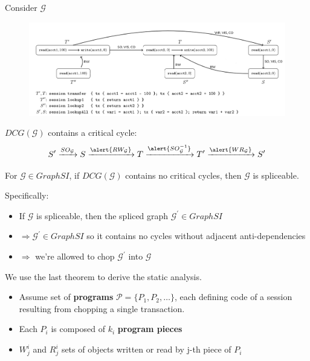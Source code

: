 \documentclass{beamer}
\begin{document}
\begin{frame}
	Consider $\mathcal{G}$
	\begin{figure}
		\includegraphics[scale=0.25]{fig4}
	\end{figure}
	\begin{example}
		$DCG(\mathcal{G})$ contains a critical cycle:
		$$  
			S^\prime \xrightarrow{SO_\mathcal{G}}
			S \xrightarrow{\alert{RW_\mathcal{G}}} 
			T \xrightarrow{\alert{SO^{-1}_\mathcal{G}}} 
			T^\prime \xrightarrow{\alert{WR_\mathcal{G}}} 
			S^\prime
		$$
	\end{example}
\end{frame}


\begin{frame}
	\begin{theorem}
		For $\mathcal{G} \in GraphSI$, if $DCG(\mathcal{G})$ contains no critical cycles, then $\mathcal{G}$ is spliceable.
	\end{theorem}
	Specifically:
	\begin{itemize}
		\item If $\mathcal{G}$ is spliceable, then the spliced graph $\mathcal{G}^\prime \in GraphSI$
		\item $\Rightarrow \mathcal{G}^\prime \in GraphSI$ so it contains no cycles without adjacent anti-dependencies
		\item $\Rightarrow$ we're allowed to chop $\mathcal{G}^\prime$ into $\mathcal{G}$
	\end{itemize}
\end{frame}


\begin{frame}
We use the last theorem to derive the static analysis.
\begin{itemize}
	\item Assume set of \textbf{programs} $\mathcal{P}=\{P_1, P_2, \dots\}$, each defining code of a session resulting from chopping a single transaction.
	\item Each $P_i$ is composed of $k_i$ \textbf{program pieces}
	\item $W^i_j$ and $R^i_j$ sets of objects written or read by j-th piece of $P_i$ 
\end{itemize}
\end{frame}
\end{document}
